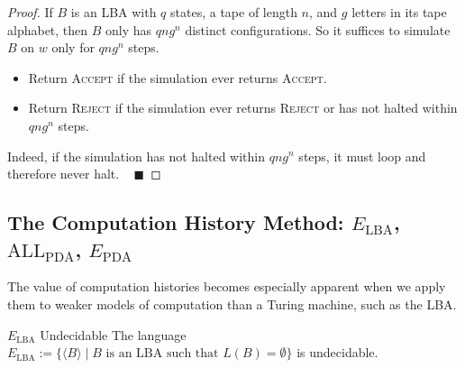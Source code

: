 \begin{proof}
    If $B$ is an LBA with $q$ states,
    a tape of length $n$,
    and $g$ letters in its tape alphabet,
    then $B$ only has $qng^n$ distinct configurations.
    So it suffices to simulate $B$ on $w$
    only for $qng^n$ steps.
    \begin{itemize}
        \item Return \textsc{Accept}
        if the simulation ever returns \textsc{Accept}.
        \item Return \textsc{Reject}
        if the simulation ever returns \textsc{Reject}
        or has not halted within $qng^n$ steps.
    \end{itemize}
    Indeed, if the simulation has not halted within $qng^n$ steps,
    it must loop and therefore never halt. ~ $\blacksquare$
\end{proof}

\subsection{The Computation History Method:
$E_{\mathrm{LBA}}$, $\mathrm{ALL}_{\mathrm{PDA}}$,
$E_{\mathrm{PDA}}$}

The value of computation histories becomes especially apparent
when we apply them to weaker models of computation than a Turing machine,
such as the LBA.

\begin{theorem}{$E_{\mathrm{LBA}}$ Undecidable}
    The language $E_{\mathrm{LBA}} := \{
        \langle B \rangle \mid
        B \text{ is an LBA such that } L(B) = \emptyset
    \}$ is undecidable.
\end{theorem}

